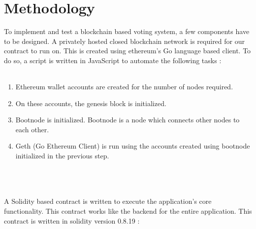 \documentclass[10pt,final,journal,a4paper,oneside,twocolumn]{IEEEtran}
\begin{document}
	\section{Methodology}
		To implement and test a blockchain based voting system, a few components have to be designed. A privately hosted closed blockchain network is required for our contract to run on. This is created using ethereum’s Go language based client. To do so, a script is written in JavaScript to automate the following tasks :
		\\\\\colorbox{gray!20}{%
	        \begin{minipage}{\linewidth}%
	            \vspace*{2pt}
	           	\begin{enumerate}
	           		\item Ethereum wallet accounts are created for the number of nodes required.
	           		\item On these accounts, the genesis block is initialized.
	           		\item Bootnode is initialized. Bootnode is a node which connects other nodes to each other.
	           		\item Geth (Go Ethereum Client) is run using the accounts created using bootnode initialized in the previous step.
	           	\end{enumerate}
	            \vspace*{2pt}
	        \end{minipage}%
	    }
		\\\\\\A Solidity based contract is written to execute the application’s core functionality. This contract works like the backend for the entire application. This contract is written in solidity version 0.8.19 :
\end{document}
